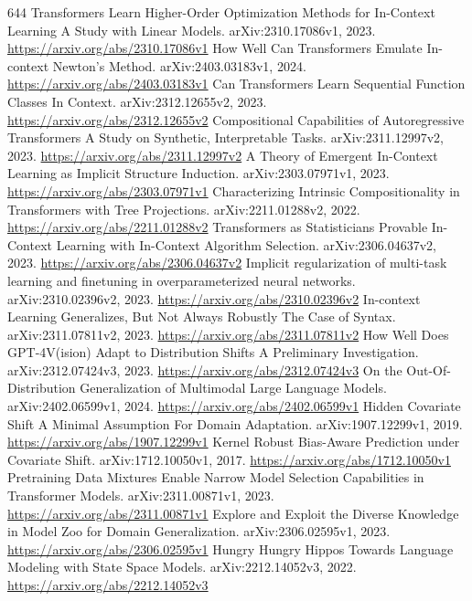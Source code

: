 \documentclass[11pt]{article}
\begin{document}
\begin{thebibliography}{644}
 Transformers Learn Higher-Order Optimization Methods for In-Context Learning A Study with Linear Models. arXiv:2310.17086v1, 2023. \url{https://arxiv.org/abs/2310.17086v1}
 How Well Can Transformers Emulate In-context Newton's Method. arXiv:2403.03183v1, 2024. \url{https://arxiv.org/abs/2403.03183v1}
 Can Transformers Learn Sequential Function Classes In Context. arXiv:2312.12655v2, 2023. \url{https://arxiv.org/abs/2312.12655v2}
 Compositional Capabilities of Autoregressive Transformers A Study on Synthetic, Interpretable Tasks. arXiv:2311.12997v2, 2023. \url{https://arxiv.org/abs/2311.12997v2}
 A Theory of Emergent In-Context Learning as Implicit Structure Induction. arXiv:2303.07971v1, 2023. \url{https://arxiv.org/abs/2303.07971v1}
 Characterizing Intrinsic Compositionality in Transformers with Tree Projections. arXiv:2211.01288v2, 2022. \url{https://arxiv.org/abs/2211.01288v2}
 Transformers as Statisticians Provable In-Context Learning with In-Context Algorithm Selection. arXiv:2306.04637v2, 2023. \url{https://arxiv.org/abs/2306.04637v2}
 Implicit regularization of multi-task learning and finetuning in overparameterized neural networks. arXiv:2310.02396v2, 2023. \url{https://arxiv.org/abs/2310.02396v2}
 In-context Learning Generalizes, But Not Always Robustly The Case of Syntax. arXiv:2311.07811v2, 2023. \url{https://arxiv.org/abs/2311.07811v2}
 How Well Does GPT-4V(ision) Adapt to Distribution Shifts A Preliminary Investigation. arXiv:2312.07424v3, 2023. \url{https://arxiv.org/abs/2312.07424v3}
 On the Out-Of-Distribution Generalization of Multimodal Large Language Models. arXiv:2402.06599v1, 2024. \url{https://arxiv.org/abs/2402.06599v1}
 Hidden Covariate Shift A Minimal Assumption For Domain Adaptation. arXiv:1907.12299v1, 2019. \url{https://arxiv.org/abs/1907.12299v1}
 Kernel Robust Bias-Aware Prediction under Covariate Shift. arXiv:1712.10050v1, 2017. \url{https://arxiv.org/abs/1712.10050v1}
 Pretraining Data Mixtures Enable Narrow Model Selection Capabilities in Transformer Models. arXiv:2311.00871v1, 2023. \url{https://arxiv.org/abs/2311.00871v1}
 Explore and Exploit the Diverse Knowledge in Model Zoo for Domain Generalization. arXiv:2306.02595v1, 2023. \url{https://arxiv.org/abs/2306.02595v1}
 Hungry Hungry Hippos Towards Language Modeling with State Space Models. arXiv:2212.14052v3, 2022. \url{https://arxiv.org/abs/2212.14052v3}

\end{thebibliography}
\end{document}
